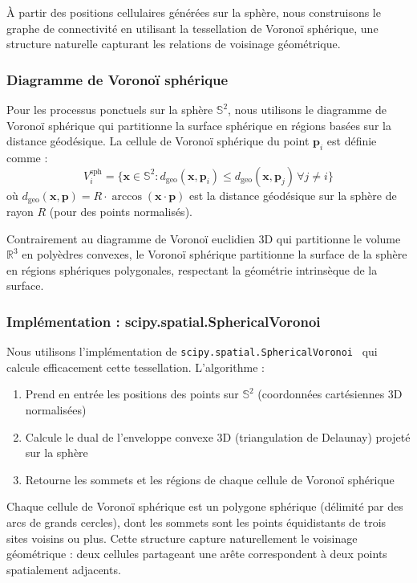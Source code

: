 À partir des positions cellulaires générées sur la sphère, nous construisons le graphe de connectivité en utilisant la tessellation de Voronoï sphérique, une structure naturelle capturant les relations de voisinage géométrique.

\subsubsection{Diagramme de Voronoï sphérique}

Pour les processus ponctuels sur la sphère $\mathbb{S}^2$, nous utilisons le diagramme de Voronoï sphérique qui partitionne la surface sphérique en régions basées sur la distance géodésique. La cellule de Voronoï sphérique du point $\mathbf{p}_i$ est définie comme :
\[
V_i^{\text{sph}} = \{\mathbf{x} \in \mathbb{S}^2 : d_{\text{geo}}(\mathbf{x}, \mathbf{p}_i) \leq d_{\text{geo}}(\mathbf{x}, \mathbf{p}_j) \, \forall j \neq i\}
\]
où $d_{\text{geo}}(\mathbf{x}, \mathbf{p}) = R \cdot \arccos(\mathbf{x} \cdot \mathbf{p})$ est la distance géodésique sur la sphère de rayon $R$ (pour des points normalisés).

Contrairement au diagramme de Voronoï euclidien 3D qui partitionne le volume $\mathbb{R}^3$ en polyèdres convexes, le Voronoï sphérique partitionne la surface de la sphère en régions sphériques polygonales, respectant la géométrie intrinsèque de la surface.

\subsubsection{Implémentation : scipy.spatial.SphericalVoronoi}

Nous utilisons l'implémentation de \texttt{scipy.spatial.SphericalVoronoi}~\cite{scipy} qui calcule efficacement cette tessellation. L'algorithme :
\begin{enumerate}
    \item Prend en entrée les positions des points sur $\mathbb{S}^2$ (coordonnées cartésiennes 3D normalisées)
    \item Calcule le dual de l'enveloppe convexe 3D (triangulation de Delaunay) projeté sur la sphère
    \item Retourne les sommets et les régions de chaque cellule de Voronoï sphérique
\end{enumerate}

Chaque cellule de Voronoï sphérique est un polygone sphérique (délimité par des arcs de grands cercles), dont les sommets sont les points équidistants de trois sites voisins ou plus. Cette structure capture naturellement le voisinage géométrique : deux cellules partageant une arête correspondent à deux points spatialement adjacents.


